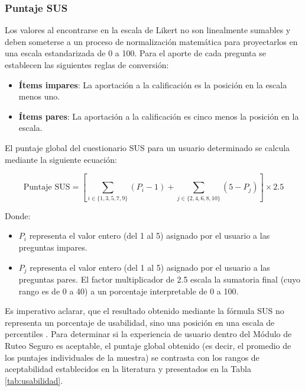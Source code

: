 \subsubsection{Puntaje SUS}

Los valores al encontrarse en la escala de Likert no son linealmente sumables y deben someterse a un proceso de normalización matemática para proyectarlos en una escala estandarizada de 0 a 100. Para el aporte de cada pregunta se establecen las siguientes reglas de conversión:
\begin{itemize}
    \item \textbf{Ítems impares}: La aportación a la calificación es la posición en la escala menos uno.
    \item \textbf{Ítems pares}: La aportación a la calificación es cinco menos la posición en la escala.
\end{itemize}

El puntaje global del cuestionario SUS para un usuario determinado se calcula mediante la siguiente ecuación:

\begin{equation}
\text{Puntaje SUS} = \left[ \sum_{i \in \{1,3,5,7,9\}} (P_{i} - 1) + \sum_{j \in \{2,4,6,8,10\}} (5 - P_{j}) \right] \times 2.5
\end{equation}

Donde:
\begin{itemize}
    \item $P_{i}$ representa el valor entero (del 1 al 5) asignado por el usuario a las preguntas impares.
    \item $P_{j}$ representa el valor entero (del 1 al 5) asignado por el usuario a las preguntas pares. El factor multiplicador de 2.5 escala la sumatoria final (cuyo rango es de 0 a 40) a un porcentaje interpretable de 0 a 100.
\end{itemize}
   
Es imperativo aclarar, que el resultado obtenido mediante la fórmula SUS no representa un porcentaje de usabilidad, sino una posición en una escala de percentiles \cite{bangor2008empirical}. Para determinar si la experiencia de usuario dentro del Módulo de Ruteo Seguro es aceptable, el puntaje global obtenido (es decir, el promedio de los puntajes individuales de la muestra) se contrasta con los rangos de aceptabilidad establecidos en la literatura y presentados en la Tabla \ref{tab:usabilidad}.

